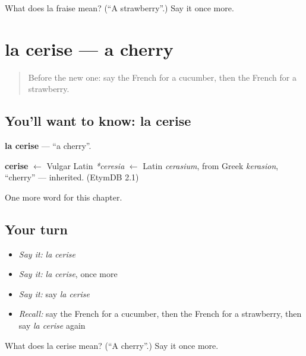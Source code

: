\begin{tcolorbox}[breakable,colback=teal!4,colframe=teal!35!black,title={Before you move on}]
What does la fraise mean? (\textquotedblleft{}A strawberry\textquotedblright{}.) Say it once more.
\end{tcolorbox}
\section[la cerise]{la cerise — a cherry}

\label{lesson:FR-C120-cerise}



\begin{quote}
Before the new one: say the French for a cucumber, then the French for a strawberry.
\end{quote}

\subsection*{You'll want to know: la cerise}
\textbf{la cerise} — \textquotedblleft{}a cherry\textquotedblright{}.

\begin{cousinweb}
\textbf{cerise} $\leftarrow$ Vulgar Latin \emph{*ceresia} $\leftarrow$ Latin \emph{cerasium}, from Greek \emph{kerasion}, \textquotedblleft{}cherry\textquotedblright{} — inherited. (EtymDB 2.1)
\end{cousinweb}

\begin{grammarlens}[title={What you've built}]
One more word for this chapter.
\end{grammarlens}

\subsection*{Your turn}
\begin{itemize}
\raggedright
  \item \emph{Say it:} \emph{la cerise}
  \item \emph{Say it:} \emph{la cerise}, once more
  \item \emph{Say it:} say \emph{la cerise}
  \item \emph{Recall:} say the French for a cucumber, then the French for a strawberry, then say \emph{la cerise} again
\end{itemize}

\begin{tcolorbox}[breakable,colback=teal!4,colframe=teal!35!black,title={Before you move on}]
What does la cerise mean? (\textquotedblleft{}A cherry\textquotedblright{}.) Say it once more.
\end{tcolorbox}
